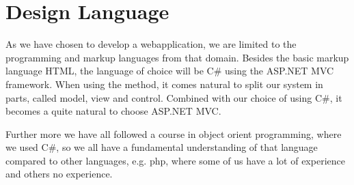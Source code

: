 \section{Design Language}
\label{sec:design_language}
As we have chosen to develop a webapplication, we are limited to the programming and markup languages from that domain.
Besides the basic markup language HTML, the language of choice will be C\# using the ASP.NET MVC framework.
When using the \ooad method, it comes natural to split our system in parts, called model, view and control. 
Combined with our choice of using C\#, it becomes a quite natural to choose ASP.NET MVC.

Further more we have all followed a course in object orient programming, where we used C\#, so we all have a fundamental understanding of that language compared to other languages, e.g. php, where some of us have a lot of experience and others no experience.
